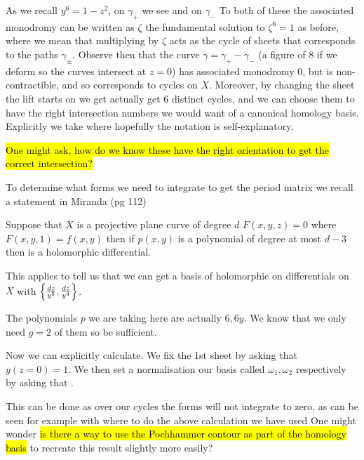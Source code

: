 \documentclass{article}
\begin{document}
As we recall $y^6 = 1-z^2$, on $\gamma_+$ we see 
and on $\gamma_-$ 
To both of these the associated monodromy can be written as $\zeta$ the fundamental solution to $\zeta^6=1$ as before, where we mean that multiplying by $\zeta$ acts as the cycle of sheets that corresponds to the paths $\gamma_\pm$. Observe then that the curve $\gamma = \gamma_+ - \gamma_-$ (a figure of 8 if we deform so the curves intersect at $z=0$) has associated monodromy 0, but is non-contractible, and so corresponds to cycles on $X$. Moreover, by changing the sheet the lift starts on we get actually get $6$ distinct cycles, and we can choose them to have the right intersection numbers we would want of a canonical homology basis. Explicitly we take
where hopefully the notation is self-explanatory. 
\begin{remark}
	\hl{One might ask, how do we know these have the right orientation to get the correct intersection?}
\end{remark}
To determine what forms we need to integrate to get the period matrix we recall a statement in Miranda (pg 112)
\begin{lemma}
	Suppose that $X$ is a projective plane curve of degree $d$ $F(x,y,z)=0$ where $F(x,y,1)=f(x,y)$ then if $p(x,y)$ is a polynomial of degree at most $d-3$ then 
is a holomorphic differential. 
\end{lemma}
This applies to tell us that we can get a basis of holomorphic on differentials on $X$ with $\left\{ \frac{dz}{y^5}, \frac{dz}{y^4} \right\}$. 
\begin{remark}
The polynomials $p$ we are taking here are actually $6, 6y$. We know that we only need $g=2$ of them so be sufficient. 	
\end{remark}
Now we can explicitly calculate. We fix the 1st sheet by asking that $y(z=0)=1$. We then set a normalisation our basis called $\omega_1, \omega_2$ respectively by asking that .
\begin{remark}
This can be done as over our cycles the forms will not integrate to zero, as can be seen for example with 
where to do the above calculation we have used 
One might wonder \hl{is there a way to use the Pochhammer contour as part of the homology basis} to recreate this result slightly more easily? 
\end{remark}
\end{document}
